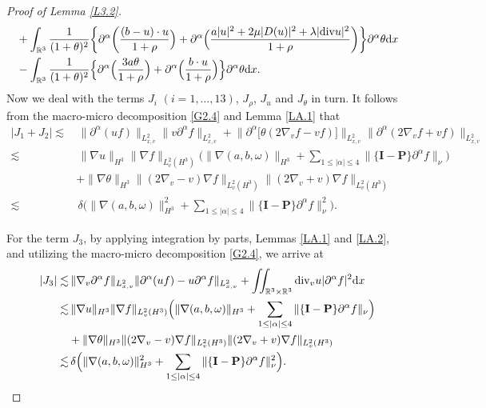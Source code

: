 \documentclass[reqno,11pt]{amsart}
\theoremstyle{plain}
\numberwithin{equation}{section}
\begin{document}
\begin{proof}[Proof of Lemma \ref{L3.2}]
\begin{align*}
&+\int_{\mathbb{R}^3} \frac{1}{(1+\theta)^2}\bigg\{\partial^\alpha \bigg( \frac{(b-u)\cdot u}{1+\rho}  \Big)+\partial^\alpha\Big(\frac{a|u|^2+2\mu |D(u)|^2+\lambda |{\rm div} u|^2}{1+\rho}\bigg)\bigg\}\partial^\alpha\theta {\rm d}x \nonumber\\
&-\int_{\mathbb{R}^3}\frac{1}{(1+\theta)^2}\Big\{\partial^\alpha\Big(  \frac{3  a\theta}{1+\rho} \Big)+\partial^\alpha\Big(  \frac{  b\cdot u}{1+\rho} \Big)\Big\} \partial^\alpha\theta{\rm d}x.
\end{align*} 
 Now we deal with the terms $J_i$ $(i=1,\dots, 13)$, $J_{\rho}$, $J_u$ and $J_{\theta}$ in turn. 
It follows from the macro-micro decomposition  \eqref{G2.4} and Lemma \ref{LA.1} that  
\begin{align}\label{G3.11}
|J_1+J_2| \lesssim&\, \|\partial^\alpha(u f)\|_{L_{x,v}^2}\|v\partial^\alpha f\|_{L_{x,v}^2}+\big\|\partial^\alpha\big[\theta(2\nabla_v f-vf) \big]\big\|_{L_{x,v}^2} \|\partial^\alpha  (2\nabla_v f+vf)   \|_{L_{x,v}^2} \nonumber\\
\lesssim&\,\|\nabla u\|_{H^3}\|\nabla f\|_{L_v^2(H^3)}\Big(\|\nabla(a,b,\omega)\|_{H^3}+\sum_{1\leq |\alpha|\leq 4}\|\{\mathbf{I}-\mathbf{P}\}\partial^\alpha f\|_{\nu}\Big)\nonumber\\
&+\|\nabla\theta\|_{H^3}\|(2\nabla_v-v)\nabla f\|_{L_v^2(H^3)} \|(2\nabla_v+v)\nabla f\|_{L_v^2(H^3)}\nonumber\\
\lesssim&\,\delta\Big(\|\nabla(a,b,\omega)\|_{H^3}^2+\sum_{1\leq |\alpha|\leq 4}\|\{\mathbf{I}-\mathbf{P}\}\partial^\alpha f\|_{\nu}^2\Big).
\end{align}

For the term $J_3$, by applying integration by parts, Lemmas \ref{LA.1} and \ref{LA.2}, and utilizing the macro-micro decomposition \eqref{G2.4}, we arrive at  
\begin{align}\label{G3.12}
|J_3|\lesssim&\, \|\nabla_v \partial^\alpha f\|_{L_{x,v}^2}\|\partial^\alpha (uf)-u\partial^\alpha f\|_{L_{x,v}^2} +\iint_{\mathbb{R}^3\times\mathbb{R}^3} {\rm div}_v u |\partial^\alpha f|^2 {\rm d}x\nonumber\\
\lesssim&\,\|\nabla u\|_{H^3}\|\nabla f\|_{L_v^2(H^3)}\Big(\|\nabla(a,b,\omega)\|_{H^3}+\sum_{1\leq |\alpha|\leq 4}\|\{\mathbf{I}-\mathbf{P}\}\partial^\alpha f\|_{\nu}\Big)\nonumber\\
&+\|\nabla\theta\|_{H^3}\|(2\nabla_v-v)\nabla f\|_{L_v^2(H^3)} \|(2\nabla_v+v)\nabla f\|_{L_v^2(H^3)}\nonumber\\
\lesssim&\,\delta \Big(\|\nabla(a,b,\omega)\|_{H^3}^2+\sum_{1\leq |\alpha|\leq 4}\|\{\mathbf{I}-\mathbf{P}\}\partial^\alpha f\|_{\nu}^2\Big).
\end{align} 


\end{proof}
\end{document}
